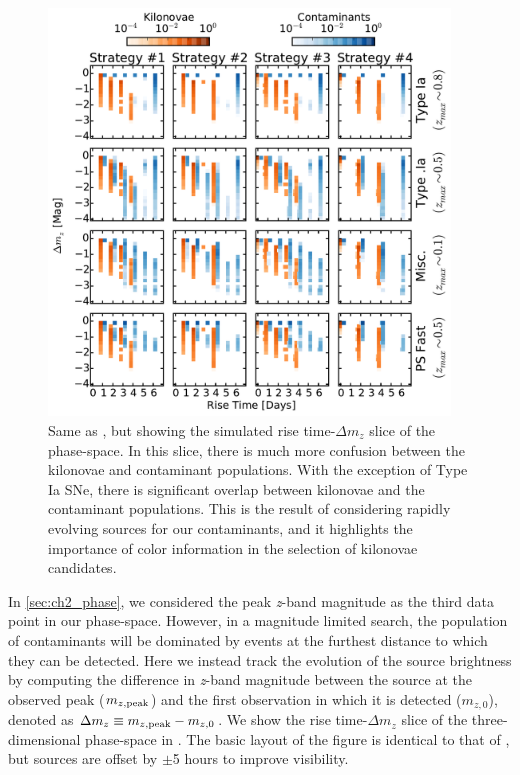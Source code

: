 \begin{figure}[t!]
\centering
\includegraphics[width=0.95\textwidth]{./figs/chapter2/ch2_f9.pdf}
\caption{Same as , but showing the simulated rise time-$\Delta m_z$ slice of the phase-space. In this slice, there is much more confusion between the kilonovae and contaminant populations. With the exception of Type Ia SNe, there is significant overlap between kilonovae and the contaminant populations. This is the result of considering rapidly evolving sources for our contaminants, and it highlights the importance of color information in the selection of kilonovae candidates.}
\label{fig:ch2_mcphasedm}
\end{figure}

In \cref{sec:ch2_phase}, we considered the peak {\em z}-band magnitude as the third data point in our phase-space. However, in a magnitude limited search, the population of contaminants will be dominated by events at the furthest distance to which they can be detected. Here we instead track the evolution of the source brightness by computing the difference in {\em z}-band magnitude between the source at the observed peak ($m_{z,{\rm peak}}$) and the first observation in which it is detected ($m_{z,0}$), denoted as $\Delta m_z \equiv m_{z,{\rm peak}} - m_{z,0}$. We show the rise time-$\Delta m_z$ slice of the three-dimensional phase-space in . The basic layout of the figure is identical to that of , but sources are offset by $\pm$5 hours to improve visibility.

